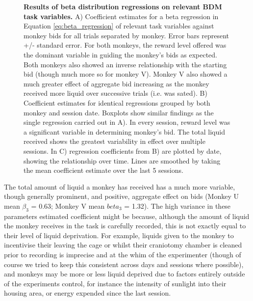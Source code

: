 \begin{figure}[htbp!] 
\centering    

\caption[Results of beta distribution regressions on relevant BDM task variables.]{\textbf{Results of beta distribution regressions on relevant BDM task variables.} A) Coefficient estimates for a beta regression in Equation \ref{eq:beta_regression} of relevant task variables against monkey bids for all trials separated by monkey. Error bars represent +/- standard error. For both monkeys, the reward level offered was the dominant variable in guiding the monkey’s bids as expected. Both monkeys also showed an inverse relationship with the starting bid (though much more so for monkey V). Monkey V also showed a much greater effect of aggregate bid increasing as the monkey received more liquid over successive trials (i.e. was sated). B) Coefficient estimates for identical regressions grouped by both monkey and session date. Boxplots show similar findings as the single regression carried out in A). In every session, reward level was a significant variable in determining monkey’s bid. The total liquid received shows the greatest variability in effect over multiple sessions. In C) regression coefficients from B) are plotted by date, showing the relationship over time. Lines are smoothed by taking the mean coefficient estimate over the last 5 sessions.}
\label{fig:regression_estimates}
\end{figure}

The total amount of liquid a monkey has received has a much more variable, though generally prominent, and positive, aggregate effect on bids (Monkey U mean $\beta_3$ = 0.63; Monkey V mean $beta_3$ = 1.32). The high variance in these parameters estimated coefficient might be because, although the amount of liquid the monkey receives in the task is carefully recorded, this is not exactly equal to their level of liquid deprivation. For example, liquids given to the monkey to incentivise their leaving the cage or whilst their craniotomy chamber is cleaned prior to recording is imprecise and at the whim of the experimenter (though of course we tried to keep this consistent across days and sessions where possible), and monkeys may be more or less liquid deprived due to factors entirely outside of the experiments control, for instance the intensity of sunlight into their housing area, or energy expended since the last session.

